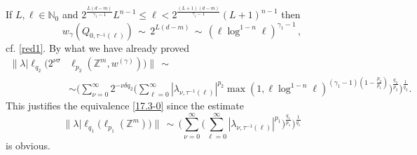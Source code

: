 \documentclass[12pt]{article}
\newcommand{\N}{{\mathbb N}}
\newcommand{\Z}{\mathbb Z}
\begin{document}
If $L,\ell\in \N_0$ and $2^{\frac{L(d-m)}{\gamma_1-1}}L^{n-1}\le \ell <2^{\frac{(L+1)(d-m)}{\gamma_i-1}}(L+1)^{n-1}$ then 
\begin{equation}\label{red2a}
	w_\gamma (Q_{0,\tau^{-1}(\ell)}) \,\sim\,  2^{L(d-m)}\, \sim \, (\ell\log^{1-n}\ell)^{\gamma_1-1}\, ,
\end{equation}
cf. \eqref{red1}. By what we have already proved %
\begin{align}\label{17.3-2}\nonumber
	\Big\|\lambda \Big|\ell_{q_2}\big(2^{\nu \sigma}&\ell_{p_2}(\Z^m, w^{(\gamma)})\big) \Big\|   \, \sim \, \\
	&  \sim \bigg(\sum_{\nu=0}^\infty 2^{-\nu \delta q_2}\bigg(\sum_{\ell=0}^\infty |\lambda_{\nu,\tau^{-1}(\ell)}|^{p_2} 
	\max(1,\ell\log^{1-n}\ell)^{(\gamma_1-1)(1-\frac{p_2}{p_1})}\bigg)^{\frac{q_2}{p_2}}\bigg)^{\frac{1}{q_2}}. \nonumber
\end{align}
This justifies the equivalence \eqref{17.3-0} since the estimate 
\[
\Big\|\lambda \Big|\ell_{q_1}\big(\ell_{p_1}(\Z^m)\big) \Big\|   \, \sim \, \bigg(\sum_{\nu=0}^\infty \bigg(\sum_{\ell=0}^\infty |\lambda_{\nu,\tau^{-1}(\ell)}|^{p_1} \bigg)^{\frac{q_1}{p_1}}\bigg)^{\frac{1}{q_1}}  
\]
is obvious. 
\end{document}

